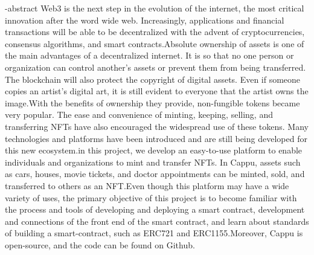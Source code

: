 
\en-abstract{
  Web3 is the next step in the evolution of the internet, the most critical innovation after the word wide web. Increasingly, applications and financial transactions will be able to be decentralized with the advent of cryptocurrencies, consensus algorithms, and smart contracts.\newline \indent Absolute ownership of assets is one of the main advantages of a decentralized internet. It is so that no one person or organization can control another's assets or prevent them from being transferred. The blockchain will also protect the copyright of digital assets. Even if someone copies an artist's digital art, it is still evident to everyone that the artist owns the image.\newline \indent With the benefits of ownership they provide, non-fungible tokens became very popular. The ease and convenience of minting, keeping, selling, and transferring NFTs have also encouraged the widespread use of these tokens. Many technologies and platforms have been introduced and are still being developed for this new ecosystem.\newline \indent in this project, we develop an easy-to-use platform to enable individuals and organizations to mint and transfer NFTs. In Cappu, assets such as cars, houses, movie tickets, and doctor appointments can be minted, sold, and transferred to others as an NFT.\newline \indent Even though this platform may have a wide variety of uses, the primary objective of this project is to become familiar with the process and tools of developing and deploying a smart contract, development and connections of the front end of the smart contract, and learn about standards of building a smart-contract, such as ERC721 and ERC1155.\newline \indent Moreover, Cappu is open-source, and the code can be found on Github.
}
